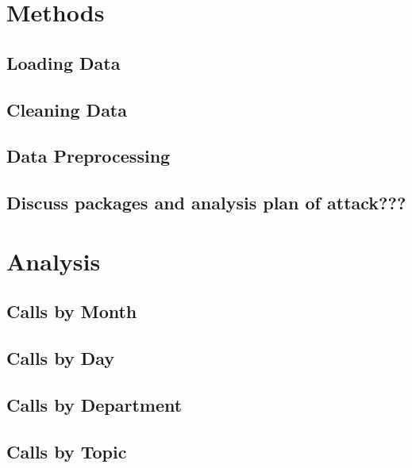 \documentclass[11pt,twocolumn]{article}
\begin{document}
\section{Methods}


	\subsection{Loading Data}



	\subsection{Cleaning Data}


	\subsection{Data Preprocessing}



	\subsection{Discuss packages and analysis plan of attack???}



\section{Analysis}

	\subsection{Calls by Month}



	\subsection{Calls by Day}



	\subsection{Calls by Department}



	\subsection{Calls by Topic}
\end{document}
